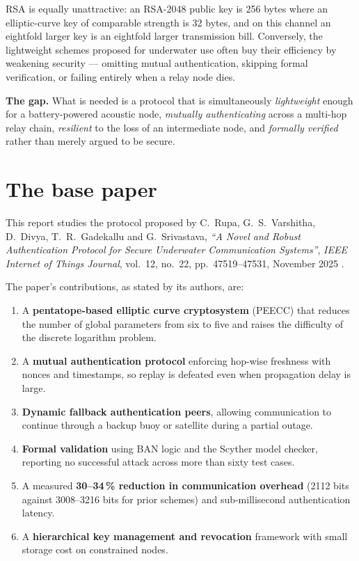 RSA is equally unattractive: an RSA-2048 public key is 256 bytes where an elliptic-curve key
of comparable strength is 32 bytes, and on this channel an eightfold larger key is an
eightfold larger transmission bill. Conversely, the lightweight schemes proposed for
underwater use often buy their efficiency by weakening security --- omitting mutual
authentication, skipping formal verification, or failing entirely when a relay node dies.

\begin{keybox}
\textbf{The gap.} What is needed is a protocol that is simultaneously
\emph{lightweight} enough for a battery-powered acoustic node,
\emph{mutually authenticating} across a multi-hop relay chain,
\emph{resilient} to the loss of an intermediate node, and
\emph{formally verified} rather than merely argued to be secure.
\end{keybox}

\section{The base paper}

This report studies the protocol proposed by C.~Rupa, G.~S.~Varshitha, D.~Divya,
T.~R.~Gadekallu and G.~Srivastava, \emph{``A Novel and Robust Authentication Protocol for
Secure Underwater Communication Systems''}, \emph{IEEE Internet of Things Journal},
vol.~12, no.~22, pp.~47519--47531, November 2025 \cite{basepaper}.

The paper's contributions, as stated by its authors, are:

\begin{enumerate}
\item A \textbf{pentatope-based elliptic curve cryptosystem} (PEECC) that reduces the number
      of global parameters from six to five and raises the difficulty of the discrete
      logarithm problem.
\item A \textbf{mutual authentication protocol} enforcing hop-wise freshness with nonces and
      timestamps, so replay is defeated even when propagation delay is large.
\item \textbf{Dynamic fallback authentication peers}, allowing communication to continue
      through a backup buoy or satellite during a partial outage.
\item \textbf{Formal validation} using BAN logic and the Scyther model checker, reporting no
      successful attack across more than sixty test cases.
\item A measured \textbf{30--34\,\% reduction in communication overhead} (2112 bits against
      3008--3216 bits for prior schemes) and sub-millisecond authentication latency.
\item A \textbf{hierarchical key management and revocation} framework with small storage
      cost on constrained nodes.
\end{enumerate}

